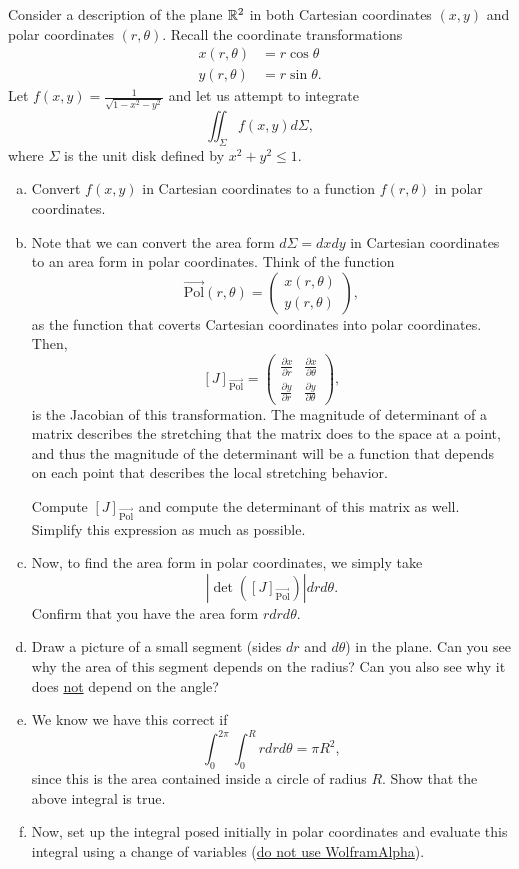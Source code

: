 \documentclass[12pt]{article} %
\begin{document}
\begin{problem}
    Consider a description of the plane $\mathbb{R}^2$ in both Cartesian coordinates $(x,y)$ and polar coordinates $(r,\theta)$.  Recall the coordinate transformations
    \begin{align*}
        x(r,\theta)&= r\cos \theta\\
        y(r,\theta)&= r\sin \theta.
    \end{align*}
    Let $f(x,y) = \frac{1}{\sqrt{1-x^2-y^2}}$ and let us attempt to integrate
    \[
    \iint_{\Sigma} f(x,y)d\Sigma,
    \]
    where $\Sigma$ is the unit disk defined by $x^2+y^2\leq 1$.
    \begin{enumerate}[(a)]
        \item Convert $f(x,y)$ in Cartesian coordinates to a function $f(r,\theta)$ in polar coordinates.
        \item Note that we can convert the area form $d\Sigma=dxdy$ in Cartesian coordinates to an area form in polar coordinates.  Think of the function
        \[
        \vec{\textrm{Pol}}(r,\theta) = \begin{pmatrix} x(r,\theta) \\ y(r,\theta) \end{pmatrix},
        \]
        as the function that coverts Cartesian coordinates into polar coordinates.  Then, 
        \[
        [J]_{\vec{\textrm{Pol}}} = \begin{pmatrix} \frac{\partial x}{\partial r} & \frac{\partial x}{\partial \theta} \\ \frac{\partial y}{\partial r} & \frac{\partial y}{\partial \theta} \end{pmatrix},
        \]
        is the Jacobian of this transformation. The magnitude of determinant of a matrix describes the stretching that the matrix does to the space at a point, and thus the magnitude of the determinant will be a function that depends on each point that describes the local stretching behavior.
        
        Compute $[J]_{\vec{\textrm{Pol}}}$ and compute the determinant of this matrix as well. Simplify this expression as much as possible.
        \item Now, to find the area form in polar coordinates, we simply take
        \[
        \left|\det\left([J]_{\vec{\textrm{Pol}}}\right)\right|drd\theta.
        \]
        Confirm that you have the area form $rdrd\theta$.
        \item Draw a picture of a small segment (sides $dr$ and $d\theta$) in the plane.  Can you see why the area of this segment depends on the radius? Can you also see why it does \underline{not} depend on the angle?
        \item We know we have this correct if 
        \[
        \int_{0}^{2\pi} \int_0^R rdrd\theta = \pi R^2,
        \]
        since this is the area contained inside a circle of radius $R$.  Show that the above integral is true.
        \item Now, set up the integral posed initially in polar coordinates and evaluate this integral using a change of variables (\underline{do not use WolframAlpha}).
    \end{enumerate}
\end{problem}
\end{document}
